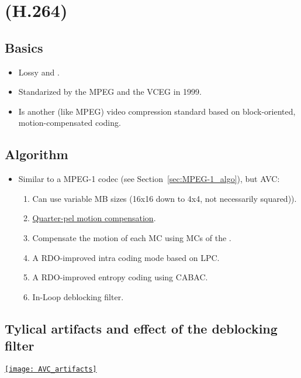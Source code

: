 \chapter{ (H.264)}

\section{Basics}
\begin{itemize}
\item Lossy and  \cite{wikipedia_AVC}.
\item Standarized by the \gls{MPEG} and the \gls{VCEG} in 1999.
\item Is another (like \gls{MPEG}) video compression standard based on
  block-oriented, motion-compensated coding.
\end{itemize}

\section{Algorithm}
\label{sec:MPEG-4_AVC_algo}
\begin{itemize}
\item Similar to a MPEG-1 codec (see Section~\ref{sec:MPEG-1_algo}),
  but \gls{AVC}:
\begin{enumerate}
\item Can use variable MB sizes (16x16 down to 4x4, not
  necessarily squared)).
\item
  \href{https://en.wikipedia.org/wiki/Motion_compensation}{Quarter-pel
    motion compensation}.
\item Compensate the motion of each MC using MCs of the
  .
\item A \gls{RDO}-improved intra coding mode based on \gls{LPC}.
\item A \gls{RDO}-improved entropy coding using \gls{CABAC}.
\item In-Loop deblocking filter.
\end{enumerate}
\end{itemize}

\section{Tylical artifacts and effect of the deblocking filter}
\begin{center}
  \href{https://www.sciencedirect.com/science/article/pii/B9780124157606000167}{\texttt{[image: AVC\_artifacts]}}
\end{center}
